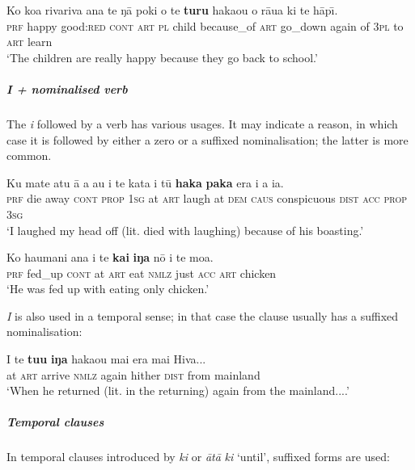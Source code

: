 \ea\label{ex:3.28}
\gll Ko koa rivariva {\ꞌ}ana te ŋā poki {\ꞌ}o te \textbf{turu} haka{\ꞌ}ou  o rāua ki te hāp{\=\i.}\\
\textsc{prf} happy good:\textsc{red} \textsc{cont} \textsc{art} \textsc{pl} child because\_of \textsc{art} go\_down again  of \textsc{3pl} to \textsc{art} learn\\

\glt
‘The children are really happy because they go back to school.’ \textstyleExampleref{[R334.128]} 
\z

\subparagraph{\textit{{\ꞌ}I} + nominalised verb} The  \textit{{\ꞌ}i} followed by a verb has various usages. It may indicate a reason, in which case it is followed by either a zero or a suffixed nominalisation; the latter is more common.

\ea\label{ex:3.29}
\gll Ku mate atu {\ꞌ}ā a au {\ꞌ}i te kata {\ꞌ}i tū \textbf{haka} \textbf{paka} era  i a ia.\\
\textsc{prf} die away \textsc{cont} \textsc{prop} \textsc{1sg} at \textsc{art} laugh at \textsc{dem} \textsc{caus} conspicuous \textsc{dist}  \textsc{acc} \textsc{prop} \textsc{3sg}\\

\glt 
‘I laughed my head off (lit. died with laughing) because of his boasting.’ \textstyleExampleref{[R230.172]} 
\z

\ea\label{ex:3.30}
\gll Ko ha{\ꞌ}umani {\ꞌ}ana {\ꞌ}i te \textbf{kai} \textbf{iŋa} nō i te moa.\\
\textsc{prf} fed\_up \textsc{cont} at \textsc{art} eat \textsc{nmlz} just \textsc{acc} \textsc{art} chicken\\

\glt
‘He was fed up with eating only chicken.’ \textstyleExampleref{[R617.202]} 
\z

\textit{{\ꞌ}I} is also used in a temporal sense; in that case the clause usually has a suffixed nominalisation:

\ea\label{ex:3.31}
\gll {\ꞌ}I te \textbf{tu{\ꞌ}u} \textbf{iŋa} haka{\ꞌ}ou mai era mai Hiva...\\
at \textsc{art} arrive \textsc{nmlz} again hither \textsc{dist} from mainland\\

\glt
‘When he returned (lit. in the returning) again from the mainland....’ \textstyleExampleref{[R487.021]} 
\z

\subparagraph{Temporal clauses} In temporal clauses introduced by \textit{ki} or \textit{{\ꞌ}ātā} \textit{ki} ‘until’, suffixed forms are used:

